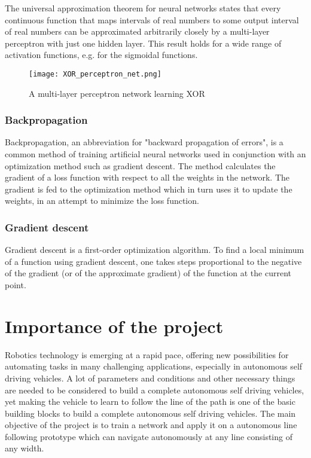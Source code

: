 \documentclass[14pt,a4paper]{extarticle}
\begin{document}
The universal approximation theorem for neural networks states that every continuous function that maps intervals of real numbers to some output interval of real numbers can be approximated arbitrarily closely by a multi-layer perceptron with just one hidden layer. This result holds for a wide range of activation functions, e.g. for the sigmoidal functions.

		\begin{figure}[H]
			\texttt{[image: XOR\_perceptron\_net.png]}
			\caption{A multi-layer perceptron network learning XOR}
		\end{figure}
		
		
	\subsubsection{Backpropagation}
	
	Backpropagation, an abbreviation for "backward propagation of errors", is a common method of training artificial neural networks used in conjunction with an optimization method such as gradient descent. The method calculates the gradient of a loss function with respect to all the weights in the network. The gradient is fed to the optimization method which in turn uses it to update the weights, in an attempt to minimize the loss function.
	
	\subsubsection{Gradient descent}
	Gradient descent is a first-order optimization algorithm. To find a local minimum of a function using gradient descent, one takes steps proportional to the negative of the gradient (or of the approximate gradient) of the function at the current point.


	\section{Importance of the project}
	
	Robotics technology is emerging at a rapid pace, offering new possibilities for automating tasks in many challenging applications, especially in autonomous self driving vehicles. A lot of parameters and conditions and other necessary things are needed to be considered to build a complete autonomous self driving vehicles, yet making the vehicle to learn to follow the line of the path is one of the basic building blocks to build a complete autonomous self driving vehicles. The main objective of the project is to train a network and apply it on a autonomous line following prototype which can navigate autonomously at any line consisting of any width.
	
\end{document}
